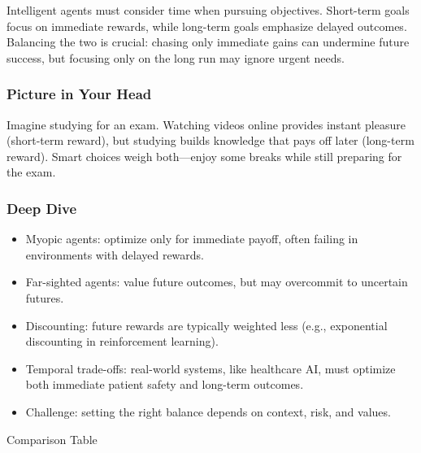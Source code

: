 \documentclass[
  letterpaper,
  DIV=11,
  numbers=noendperiod]{scrreprt}
\providecommand{\tightlist}{%
  \setlength{\itemsep}{0pt}\setlength{\parskip}{0pt}}
\begin{document}
Intelligent agents must consider time when pursuing objectives.
Short-term goals focus on immediate rewards, while long-term goals
emphasize delayed outcomes. Balancing the two is crucial: chasing only
immediate gains can undermine future success, but focusing only on the
long run may ignore urgent needs.

\subsubsection{Picture in Your Head}\label{picture-in-your-head-15}

Imagine studying for an exam. Watching videos online provides instant
pleasure (short-term reward), but studying builds knowledge that pays
off later (long-term reward). Smart choices weigh both---enjoy some
breaks while still preparing for the exam.

\subsubsection{Deep Dive}\label{deep-dive-15}

\begin{itemize}
\tightlist
\item
  Myopic agents: optimize only for immediate payoff, often failing in
  environments with delayed rewards.
\item
  Far-sighted agents: value future outcomes, but may overcommit to
  uncertain futures.
\item
  Discounting: future rewards are typically weighted less (e.g.,
  exponential discounting in reinforcement learning).
\item
  Temporal trade-offs: real-world systems, like healthcare AI, must
  optimize both immediate patient safety and long-term outcomes.
\item
  Challenge: setting the right balance depends on context, risk, and
  values.
\end{itemize}

Comparison Table
\end{document}
